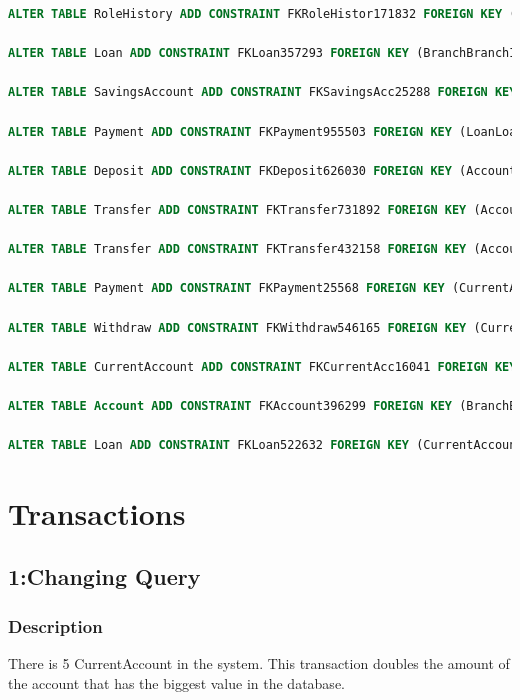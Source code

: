 \documentclass[a4paper, 10pt]{article}
\begin{document}
\begin{lstlisting}[language=SQL]
ALTER TABLE RoleHistory ADD CONSTRAINT FKRoleHistor171832 FOREIGN KEY (BranchBranchId) REFERENCES Branch (BranchId);

ALTER TABLE Loan ADD CONSTRAINT FKLoan357293 FOREIGN KEY (BranchBranchId) REFERENCES Branch (BranchId);

ALTER TABLE SavingsAccount ADD CONSTRAINT FKSavingsAcc25288 FOREIGN KEY (AccountAccountID) REFERENCES Account (AccountID);

ALTER TABLE Payment ADD CONSTRAINT FKPayment955503 FOREIGN KEY (LoanLoanID) REFERENCES Loan (LoanID);

ALTER TABLE Deposit ADD CONSTRAINT FKDeposit626030 FOREIGN KEY (AccountAccountID) REFERENCES Account (AccountID);

ALTER TABLE Transfer ADD CONSTRAINT FKTransfer731892 FOREIGN KEY (AccountAccountIDFrom) REFERENCES Account (AccountID);

ALTER TABLE Transfer ADD CONSTRAINT FKTransfer432158 FOREIGN KEY (AccountAccountIDTo) REFERENCES Account (AccountID);

ALTER TABLE Payment ADD CONSTRAINT FKPayment25568 FOREIGN KEY (CurrentAccountAccountID) REFERENCES CurrentAccount (AccountAccountID);

ALTER TABLE Withdraw ADD CONSTRAINT FKWithdraw546165 FOREIGN KEY (CurrentAccountAccountID) REFERENCES CurrentAccount (AccountAccountID);

ALTER TABLE CurrentAccount ADD CONSTRAINT FKCurrentAcc16041 FOREIGN KEY (AccountAccountID) REFERENCES Account (AccountID);

ALTER TABLE Account ADD CONSTRAINT FKAccount396299 FOREIGN KEY (BranchBranchId) REFERENCES Branch (BranchId);

ALTER TABLE Loan ADD CONSTRAINT FKLoan522632 FOREIGN KEY (CurrentAccountAccountAccountID) REFERENCES CurrentAccount (AccountAccountID);
\end{lstlisting}

\section{Transactions}

\subsection{1:Changing Query}
\subsubsection{Description}
There is 5 CurrentAccount in the system. This transaction doubles the amount of the account that has the biggest value in the database.
\end{document}
